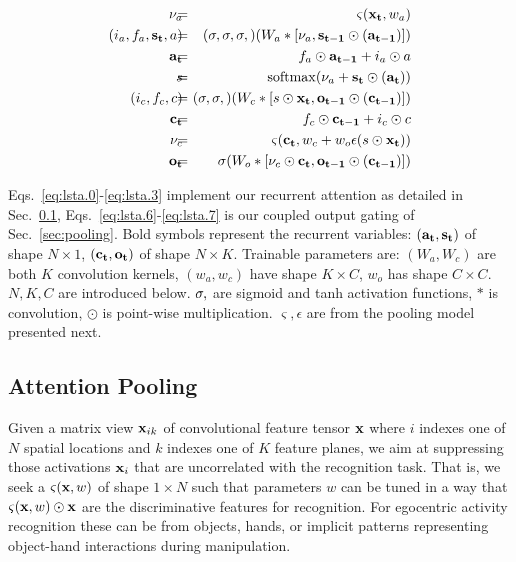 \documentclass[10pt,twocolumn,letterpaper]{article}
\let\tanh\relax
\DeclareMathOperator\tanh{\eta}
\DeclareMathOperator\softmax{softmax}
\newcommand{\io}[1]{{\bf #1}}
\def\cnv{*}
\begin{document}
\begin{eqnarray}
  \nu_a &\!\!\!\!=\!\!\!\!& \varsigma(\io{x_t}, w_a)\label{eq:lsta.0}\\
  (i_a,f_a,\io{s_t},a) &\!\!\!\!=\!\!\!\!& (\sigma,\sigma,\sigma,\tanh)(W_a \cnv [\nu_a, \io{s_{t-1}} \odot \tanh(\io{a_{t-1}})])\label{eq:lsta.1}\\\io{a_t} &\!\!\!\!=\!\!\!\!& f_a \odot \io{a_{t-1}} + i_a \odot a\label{eq:lsta.2}\\
  s &\!\!\!\!=\!\!\!\!& \softmax(\nu_a + \io{s_t} \odot \tanh(\io{a_t}))\label{eq:lsta.3}\\
  (i_c,f_c,c) &\!\!\!\!=\!\!\!\!& (\sigma,\sigma,\tanh)(W_c \cnv [s \odot \io{x_t}, \io{o_{t-1}} \odot \tanh(\io{c_{t-1}})])\label{eq:lsta.4}\\\io{c_t} &\!\!\!\!=\!\!\!\!& f_c \odot \io{c_{t-1}} + i_c \odot c\label{eq:lsta.5}\\
  \nu_c &\!\!\!\!=\!\!\!\!& \varsigma(\io{c_t}, w_c + w_o \epsilon(s \odot \io{x_t}))\label{eq:lsta.6}\\
  \io{o_t} &\!\!\!\!=\!\!\!\!& \sigma(W_o * [\nu_c\odot\io{c_t}, \io{o_{t-1}} \odot \tanh(\io{c_{t-1}})])\label{eq:lsta.7}
\end{eqnarray}

Eqs.~\ref{eq:lsta.0}-\ref{eq:lsta.3} implement our recurrent attention as detailed in Sec.~\ref{sec:attention}, Eqs.~\ref{eq:lsta.6}-\ref{eq:lsta.7} is our coupled output gating of Sec.~\ref{sec:pooling}. Bold symbols represent the recurrent variables: $(\io{a_t},\io{s_t})$ of shape $N \times 1$, $(\io{c_t},\io{o_t})$ of shape $N \times K$. Trainable parameters are: $(W_a,W_c)$ are both $K$ convolution kernels, $(w_a,w_c)$ have shape $K \times C$, $w_o$ has shape $C \times C$. $N,K,C$ are introduced below. $\sigma,\tanh$ are sigmoid and tanh activation functions, $*$ is convolution, $\odot$ is point-wise multiplication. $\varsigma,\epsilon$ are from the pooling model presented next. 

\subsection{Attention Pooling}
\label{sec:attention}

Given a matrix view $\io{x}_{ik}$ of convolutional feature tensor $\io{x}$ where $i$ indexes one of $N$ spatial locations and $k$ indexes one of $K$ feature planes, we aim at suppressing those activations $\io{x}_i$ that are uncorrelated with the recognition task. That is, we seek a $\varsigma(\io{x},w)$ of shape $1 \times N$ such that parameters $w$ can be tuned in a way that $\varsigma(\io{x},w) \odot \io{x}$ are the discriminative features for recognition. For egocentric activity recognition these can be from objects, hands, or implicit patterns representing object-hand interactions during manipulation.
\end{document}
